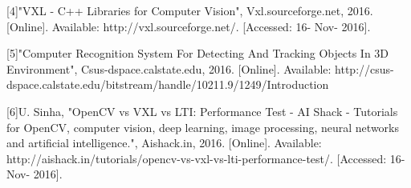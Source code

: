 \documentclass[letterpaper,10pt,onecolumn,draftclsnofoot]{IEEEtran}
\begin{document}
[4]"VXL - C++ Libraries for Computer Vision", Vxl.sourceforge.net, 2016. [Online]. Available: http://vxl.sourceforge.net/. [Accessed: 16- Nov- 2016].

[5]"Computer Recognition System For Detecting And Tracking Objects In 3D Environment", Csus-dspace.calstate.edu, 2016. [Online]. Available: http://csus-dspace.calstate.edu/bitstream/handle/10211.9/1249/Introduction%

[6]U. Sinha, "OpenCV vs VXL vs LTI: Performance Test - AI Shack - Tutorials for OpenCV, computer vision, deep learning, image processing, neural networks and artificial intelligence.", Aishack.in, 2016. [Online]. Available: http://aishack.in/tutorials/opencv-vs-vxl-vs-lti-performance-test/. [Accessed: 16- Nov- 2016].









\end{document}
